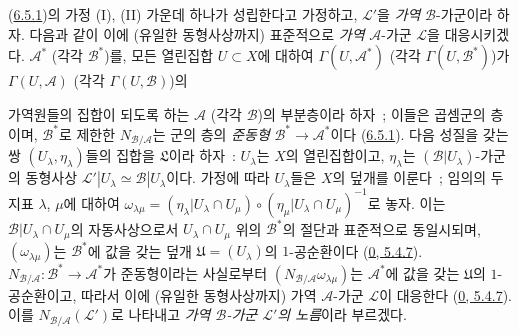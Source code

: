 \begin{env}[6.5.2]
\label{II.6.5.2-ko}
(\hyperref[II.6.5.1-ko]{6.5.1})의 가정 (I), (II) 가운데 하나가 성립한다고
가정하고, $\mathcal{L}'$을 \emph{가역} $\mathcal{B}$-가군이라 하자. 다음과
같이 이에 (유일한 동형사상까지) 표준적으로 \emph{가역}
$\mathcal{A}$-가군 $\mathcal{L}$을 대응시키겠다. $\mathcal{A}^*$ (각각
$\mathcal{B}^*$)를, 모든 열린집합 $U\subset X$에 대하여
$\Gamma(U,\mathcal{A}^*)$ (각각 $\Gamma(U,\mathcal{B}^*)$)가
$\Gamma(U,\mathcal{A})$ (각각 $\Gamma(U,\mathcal{B})$)의


가역원들의 집합이 되도록 하는 $\mathcal{A}$ (각각 $\mathcal{B}$)의
부분층이라 하자~; 이들은 곱셈군의 층이며, $\mathcal{B}^*$로 제한한
$N_{\mathcal{B}/\mathcal{A}}$는 군의 층의 \emph{준동형}
$\mathcal{B}^*\to\mathcal{A}^*$이다
(\hyperref[II.6.5.1-ko]{6.5.1}). 다음 성질을 갖는 쌍
$(U_\lambda,\eta_\lambda)$들의 집합을 $\mathfrak{L}$이라 하자~:
$U_\lambda$는 $X$의 열린집합이고, $\eta_\lambda$는
$(\mathcal{B}|U_\lambda)$-가군의 동형사상
$\mathcal{L}'|U_\lambda\simeq\mathcal{B}|U_\lambda$이다. 가정에 따라
$U_\lambda$들은 $X$의 덮개를 이룬다~; 임의의 두 지표 $\lambda$, $\mu$에
대하여
$\omega_{\lambda\mu}=(\eta_\lambda|U_\lambda\cap U_\mu)
\circ(\eta_\mu|U_\lambda\cap U_\mu)^{-1}$로 놓자. 이는
$\mathcal{B}|U_\lambda\cap U_\mu$의 자동사상으로서
$U_\lambda\cap U_\mu$ 위의 $\mathcal{B}^*$의 절단과 표준적으로
동일시되며, $(\omega_{\lambda\mu})$는 $\mathcal{B}^*$에 값을 갖는 덮개
$\mathfrak{U}=(U_\lambda)$의 $1$-공순환이다
(\hyperref[0.5.4.7-ko]{0, 5.4.7}).
$N_{\mathcal{B}/\mathcal{A}}:\mathcal{B}^*\to\mathcal{A}^*$가
준동형이라는 사실로부터
$(N_{\mathcal{B}/\mathcal{A}}\omega_{\lambda\mu})$는
$\mathcal{A}^*$에 값을 갖는 $\mathfrak{U}$의 $1$-공순환이고, 따라서
이에 (유일한 동형사상까지) 가역 $\mathcal{A}$-가군 $\mathcal{L}$이
대응한다 (\hyperref[0.5.4.7-ko]{0, 5.4.7}). 이를
$N_{\mathcal{B}/\mathcal{A}}(\mathcal{L}')$로 나타내고 \emph{가역
$\mathcal{B}$-가군 $\mathcal{L}'$의 노름}이라 부르겠다.


\end{env}
